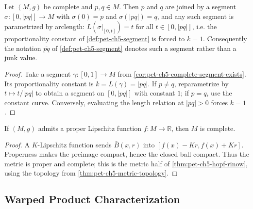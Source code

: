 \begin{corollary}
  \label{cor:pet-ch5-segment-notation-unitspeed}
  \leanok
  Let $(M,g)$ be complete and $p,q\in M$.  Then $p$ and $q$ are joined by a segment
  $\sigma:[0,|pq|]\to M$ with $\sigma(0)=p$ and $\sigma(|pq|)=q$, and any such
  segment is parametrized by arclength: $L(\sigma|_{[0,t]})=t$ for all
  $t\in[0,|pq|]$, i.e. the proportionality constant of \cref{def:pet-ch5-segment}
  is forced to $k=1$.  Consequently the notation $\overline{pq}$ of
  \cref{def:pet-ch5-segment} denotes such a segment rather than a junk value.
\end{corollary}
\begin{proof}
  \leanok
  \sketch
  Take a segment $\gamma:[0,1]\to M$ from
  \cref{cor:pet-ch5-complete-segment-exists}.  Its proportionality constant is
  $k=L(\gamma)=|pq|$.  If $p\ne q$, reparametrize by $t\mapsto t/|pq|$ to obtain
  a segment on $[0,|pq|]$ with constant $1$; if $p=q$, use the constant curve.
  Conversely, evaluating the length relation at $|pq|>0$ forces $k=1$.
\end{proof}

\begin{corollary}
  \label{cor:pet-ch5-proper-lipschitz-complete}
  \leanok
  If $(M,g)$ admits a proper Lipschitz function $f:M\to\mathbb R$, then $M$ is
  complete.
\end{corollary}
\begin{proof}
  \leanok
  \sketch
  A $K$-Lipschitz function sends $\bar B(x,r)$ into
  $[f(x)-Kr,f(x)+Kr]$. Properness makes the preimage compact, hence the closed ball
  compact. Thus the metric is proper and complete; this is the metric half of
  \cref{thm:pet-ch5-hopf-rinow}, using the topology from
  \cref{thm:pet-ch5-metric-topology}.
\end{proof}

\subsection{Warped Product Characterization}

